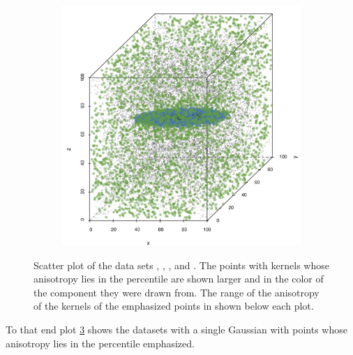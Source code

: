 \begin{figure}
\begin{subfigure}{0.23\textwidth}
				\caption{}
				\label{fig:discussion:anisotropy:baakman4}
			\end{subfigure}		
			\begin{subfigure}{0.23\textwidth}
				\centering
				\includegraphics[keepaspectratio=true, width=\textwidth, height=0.23\textheight]{discussion/img/baakman_5_60000_anisotropy.png}
				\caption{}
				\label{fig:discussion:anisotropy:baakman5}
			\end{subfigure}			
			\caption{Scatter plot of the data sets
				 \ferdosiOne, %
				 \baakmanOne, %
				 \baakmanFour, and %
				 \baakmanFive. %
				The points with kernels whose anisotropy lies in the  percentile are shown larger and in the color of the component they were drawn from. The range of the anisotropy of the kernels of the emphasized points in shown below each plot.}
			\label{fig:discussion:anisotropy:singleSphere}
		\end{figure}
		To that end plot \cref{fig:discussion:anisotropy:singleSphere} shows the datasets with a single Gaussian with points whose anisotropy lies in the  percentile emphasized. 
